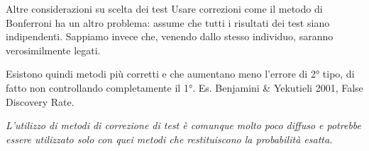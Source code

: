 \documentclass[
  ignorenonframetext,
  aspectratio=169,
]{beamer}
\begin{document}
\begin{frame}{Altre considerazioni su scelta dei test}
\label{altre-considerazioni-su-scelta-dei-test-1}
Usare correzioni come il metodo di Bonferroni ha un altro problema:
assume che tutti i risultati dei test siano indipendenti. Sappiamo
invece che, venendo dallo stesso individuo, saranno verosimilmente
legati.

Esistono quindi metodi più corretti e che aumentano meno l'errore di 2°
tipo, di fatto non controllando completamente il 1°. Es. Benjamini \&
Yekutieli 2001, False Discovery Rate.

\emph{L'utilizzo di metodi di correzione di test è comunque molto poco
diffuso e potrebbe essere utilizzato solo con quei metodi che
restituiscono la probabilità esatta.}
\end{frame}
\end{document}
